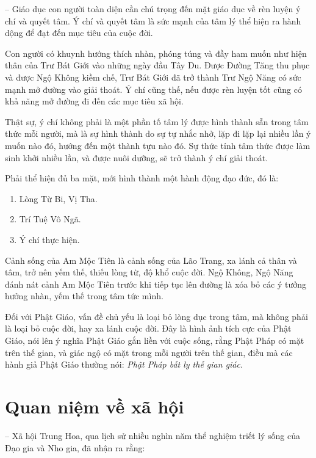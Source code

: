 -- Giáo dục con người toàn diện cần chú trọng đến mặt giáo dục về rèn luyện ý chí và quyết tâm. Ý chí và quyết tâm là sức mạnh của tâm lý thể hiện ra hành dộng để đạt đến mục tiêu của cuộc đời.

Con người có khuynh hướng thích nhàn, phóng túng và đầy ham muốn như hiện thân của Trư Bát Giới vào những ngày đầu Tây Du. Được Đường Tăng thu phục và được Ngộ Không kiềm chế, Trư Bát Giới đã trở thành Trư Ngộ Năng có sức mạnh mở đường vào giải thoát. Ý chí cũng thế, nếu được rèn luyện tốt cũng có khả năng mở đường đi đến các mục tiêu xã hội.

Thật sự, ý chí không phải là một phần tố tâm lý được hình thành sẵn trong tâm thức mỗi người, mà là sự hình thành do sự tự nhắc nhở, lặp đi lặp lại nhiều lần ý muốn nào đó, hướng đến một thành tựu nào đó. Sự thức tỉnh tâm thức được làm sinh khởi nhiều lần, và được nuôi dưỡng, sẽ trở thành ý chí giải thoát.

Phải thể hiện đủ ba mặt, mới hình thành một hành động đạo đức, đó là:

\begin{enumerate}[label=\itshape\arabic*\upshape/]
    \item Lòng Từ Bi, Vị Tha.

    \item Trí Tuệ Vô Ngã.

    \item Ý chí thực hiện.
\end{enumerate}

Cảnh sống của Am Mộc Tiên là cảnh sống của Lão Trang, xa lánh cả thân và tâm, trở nên yếm thế, thiếu lòng từ, độ khổ cuộc đời. Ngộ Không, Ngộ Năng đánh nát cảnh Am Mộc Tiên trước khi tiếp tục lên đường là xóa bỏ các ý tưởng hưởng nhàn, yếm thế trong tâm tức mình.

Đối với Phật Giáo, vấn đề chủ yếu là loại bỏ lòng dục trong tâm, mà không phải là loại bỏ cuộc đời, hay xa lánh cuộc đời. Đây là hình ảnh tích cực của Phật Giáo, nói lên ý nghĩa Phật Giáo gắn liền với cuộc sống, rằng Phật Pháp có mặt trên thế gian, và giác ngộ có mặt trong mỗi người trên thế gian, điều mà các hành giả Phật Giáo thường nói: \emph{Phật Pháp bất ly thế gian giác}.

\section{Quan niệm về xã hội} %
\label{sec:64_xa_hoi}

-- Xã hội Trung Hoa, qua lịch sử nhiều nghìn năm thể nghiệm triết lý sống của Đạo gia và Nho gia, đã nhận ra rằng:

